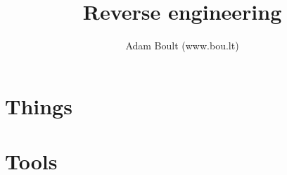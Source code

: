 \documentclass[oneside]{book}
\begin{document}
\author{Adam Boult (www.bou.lt)}
\title{Reverse engineering}
\maketitle

\setcounter{tocdepth}{0}
\tableofcontents



\part{Things}


\part{Tools}

\end{document}
